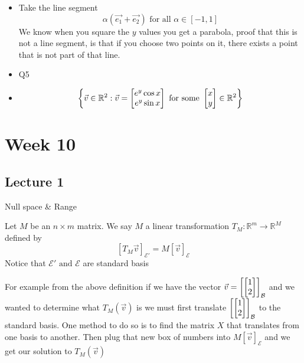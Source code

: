 \documentclass[11pt]{book}
\begin{document}
\begin{itemize}
\begin{enumerate}
    \end{enumerate}
    \item Take the line segment
        \[
            \alpha \left( \vec{e_1}  + \vec{e_2}  \right) \text{ for all  } \alpha \in \left[ -1, 1 \right] 
        \]
        We know when you square the $y$ values you get a parabola, proof that this is not a line segment, is that if you choose two points on it, there exists a point that is not part of that line. 
    \item Q5
        \item 
            \begin{gather*}
                \left\{ \vec{v} \in \mathbb{R}^2 : \vec{v} = \begin{bmatrix} e^{y} \cos{x} \\ e^{y} \sin{x} \end{bmatrix} \text{ for some  } \begin{bmatrix} x \\ y \end{bmatrix} \in \mathbb{R}^2   \right\} \\
            \end{gather*}
\end{itemize}



\chapter{Week 10}%
\label{chp:week_10}

\section{Lecture 1}%
\label{sec:lecture_1}

Null space \& Range

\begin{defn}\label{defn:induced_transformation}
    Let $M$ be an $n \times m $ matrix. We say $M$  a linear transformation $T_{M} : \mathbb{R}^{m} \to \mathbb{R}^{M}$ defined by
    \begin{equation*}
        \left[ T_{M}\vec{v} \right]_{\mathcal{E'}} = M\left[ \vec{v} \right]_{\mathcal{E}}  
    \end{equation*}
    Notice that $\mathcal{E'} \text{ and } \mathcal{E} $ are standard basis
\end{defn}

\begin{eg}
    For example from the above definition if we have the vector $\vec{v} = \left[ \begin{bmatrix} 1 \\ 2 \end{bmatrix} \right]_{\mathcal{B}}$ and we wanted to determine what $T_{M}\left(\vec{v}\right)$ is we must first translate $\left[ \begin{bmatrix} 1 \\ 2 \end{bmatrix} \right]_{\mathcal{B}}$ to the standard basis. One method to do so is to find the matrix $X$ that translates from one basis to another. Then plug that new box of numbers into $M \left[ \vec{v} \right]_{\mathcal{E}}$ and we get our solution to $T_{M}\left(\vec{v}\right)$ 
\end{eg}
\end{document}
